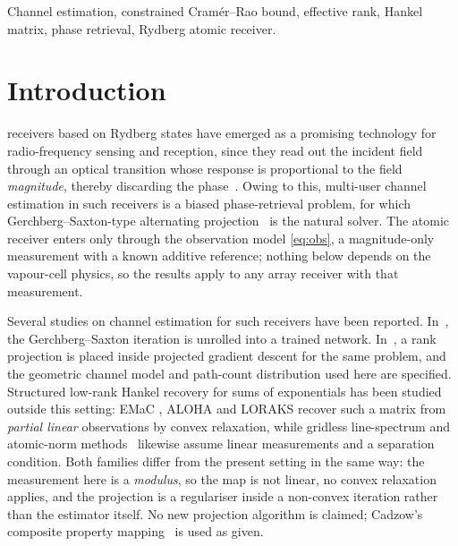 \documentclass[journal]{IEEEtran}
\begin{document}
\begin{IEEEkeywords}
Channel estimation, constrained Cram\'er--Rao bound, effective rank, Hankel
matrix, phase retrieval, Rydberg atomic receiver.
\end{IEEEkeywords}

\section{Introduction}

 receivers based on Rydberg states have emerged as a
promising technology for radio-frequency sensing and reception, since they read
out the incident field through an optical transition whose response is
proportional to the field \emph{magnitude}, thereby discarding the
phase~\cite{cui2025,gong2025mag}. Owing to this, multi-user channel estimation
in such receivers is a biased phase-retrieval problem, for which
Gerchberg--Saxton-type alternating projection~\cite{gerchberg1972} is the
natural solver. The atomic receiver enters only through the observation model
\eqref{eq:obs}, a magnitude-only measurement with a known additive reference;
nothing below depends on the vapour-cell physics, so the results apply to any
array receiver with that measurement.

Several studies on channel estimation for such receivers have been reported.
In~\cite{xiao2026}, the Gerchberg--Saxton iteration is unrolled into a trained
network. In~\cite{xu2025}, a rank projection is placed inside projected gradient
descent for the same problem, and the geometric channel model and path-count
distribution used here are specified. Structured low-rank Hankel recovery for
sums of exponentials has been studied outside this setting: EMaC
\cite{chen2014emac}, ALOHA \cite{jin2016aloha} and LORAKS
\cite{haldar2014loraks} recover such a matrix from \emph{partial linear}
observations by convex relaxation, while gridless line-spectrum and atomic-norm
methods~\cite{tang2013offgrid} likewise assume linear measurements and a
separation condition. Both families differ from the present setting in the same
way: the measurement here is a \emph{modulus}, so the map is not linear, no
convex relaxation applies, and the projection is a regulariser inside a
non-convex iteration rather than the estimator itself. No new projection
algorithm is claimed; Cadzow's composite property mapping~\cite{cadzow1988} is
used as given.
\end{document}

